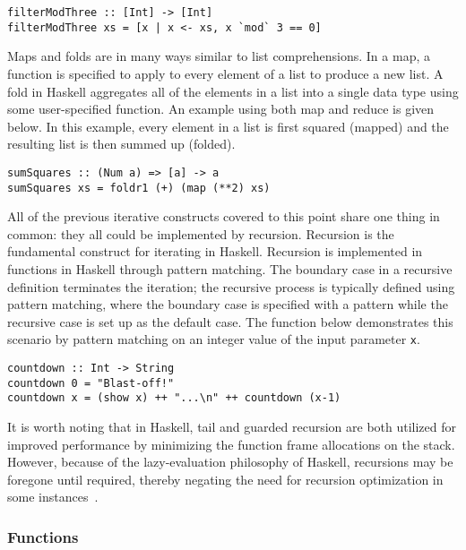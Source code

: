 \documentclass[titlepage,12pt]{article}
\begin{document}
\begin{verbatim}
filterModThree :: [Int] -> [Int]
filterModThree xs = [x | x <- xs, x `mod` 3 == 0]
\end{verbatim}

Maps and folds are in many ways similar to list comprehensions.  In a map, a function is specified to apply to
every element of a list to produce a new list.  A fold in Haskell aggregates all of the elements in a list into
a single data type using some user-specified function.  An example using both map and reduce is given below.
In this example, every element in a list is first squared (mapped) and the resulting list is then summed up (folded).

\begin{verbatim}
sumSquares :: (Num a) => [a] -> a
sumSquares xs = foldr1 (+) (map (**2) xs)
\end{verbatim}

All of the previous iterative constructs covered to this point share one thing in common:
they all could be implemented by recursion.  Recursion is the fundamental construct for iterating
in Haskell.  Recursion is implemented in functions in Haskell through pattern matching.  The boundary
case in a recursive definition terminates the iteration; the recursive process is typically defined using pattern matching,
where the boundary case is specified with a pattern while the recursive case is set up as the default case.
The function below demonstrates this scenario by pattern matching on an integer value of the input parameter \texttt{x}.

\begin{verbatim}
countdown :: Int -> String
countdown 0 = "Blast-off!"
countdown x = (show x) ++ "...\n" ++ countdown (x-1)
\end{verbatim}

It is worth noting that in Haskell, tail and guarded recursion are both utilized for improved performance 
by minimizing the function frame allocations on the stack.  However, because of the lazy-evaluation philosophy of Haskell,
recursions may be foregone until required, thereby negating the need for recursion optimization in some instances~\cite{haskell-tail-recur}.

\subsubsection{Functions}
\end{document}
